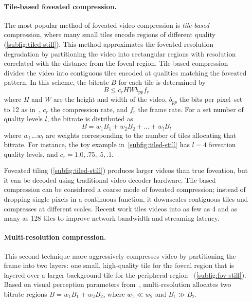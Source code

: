\paragraph{Tile-based foveated compression.}
The most popular method of foveated video compression is \emph{tile-based} compression, where many small tiles encode regions of different quality (\ref{subfig:tiled-still}).
This method approximates the foveated resolution degradation by partitioning the video into rectangular regions with resolution correlated with the distance from the foveal region.
Tile-based compression divides the video into contiguous tiles encoded at qualities matching the foveated pattern.
In this scheme, the bitrate $B$ for each tile is determined by
\begin{equation}
    B \leq c_{r}HWb_{pp}f_{r}
\end{equation}
where $H$ and $W$ are the height and width of the video, $b_{pp}$ the bits per pixel--set to 12 as in~\cite{kaplanyan2019deepfovea}, $c_r$ the compression rate, and $f_r$ the frame rate.
For a set number of quality levels $l$, the bitrate is distributed as
\begin{equation}B = w_{1}B_{1} + w_{2}B_{2} + ... + w_{l}B_{l}
\end{equation}
where $w_{1} ... w_{l}$ are weights corresponding to the number of tiles allocating that bitrate.
For instance, the toy example in~\ref{subfig:tiled-still} has $l=4$ foveation quality levels, and $c_r = {1.0, .75, .5, .1}$.

Foveated tiling (\ref{subfig:tiled-still}) produces larger videos than true foveation, but it can be decoded using traditional video decoder hardware.
Tile-based compression can be considered a coarse mode of foveated compression; instead of dropping single pixels in a continuous function, it downscales contiguous tiles and compresses at different scales.
Recent work tiles videos into as few as 4 and as many as 128 tiles to improve network bandwidth and streaming latency.

\paragraph{Multi-resolution compression.} This second technique more aggressively compresses video by partitioning the frame into two layers: one small, high-quality tile for the foveal region that is layered over a larger background tile for the peripheral region~\cite{guenter2012foveated}  (\ref{subfig:fov-still}).
Based on visual perception parameters from~\cite{guenter2012foveated}, multi-resolution allocates two bitrate regions $B = w_{1}B_{1} + w_{2}B_{2}$, where $w_{1} \ll w_{2}$ and $B_{1} \gg B_{2}$.

